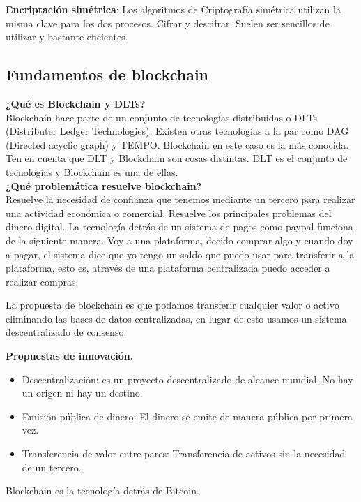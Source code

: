 \documentclass[a4paper,12pt]{lib/pub}
\begin{document}
\textbf{Encriptación simétrica}: Los algoritmos de Criptografía simétrica utilizan la misma clave para los dos procesos. Cifrar y descifrar. Suelen ser sencillos de utilizar y bastante eficientes.

\subsection{Fundamentos de blockchain}
\textbf{¿Qué es Blockchain y DLTs?}\\
Blockchain hace parte de un conjunto de tecnologías distribuidas o DLTs (Distributer Ledger Technologies). Existen otras tecnologías a la par como DAG (Directed acyclic graph) y TEMPO. Blockchain en este caso es la más conocida. Ten en cuenta que DLT y Blockchain son cosas distintas. DLT es el conjunto de tecnologías y Blockchain es una de ellas.\\

\textbf{¿Qué problemática resuelve blockchain?}\\
Resuelve la necesidad de confianza que tenemos mediante un tercero para realizar una actividad económica o comercial.
Resuelve los principales problemas del dinero digital.
La tecnología detrás de un sistema de pagos como paypal funciona de la siguiente manera. Voy a una plataforma, decido comprar algo y cuando doy a pagar, el sistema dice que yo tengo un saldo que puedo usar para transferir a la plataforma, esto es, através de una plataforma centralizada puedo acceder a realizar compras. 

La propuesta de blockchain es que podamos transferir cualquier valor o activo eliminando las bases de datos centralizadas, en lugar de esto usamos un sistema descentralizado de consenso.

\textbf{Propuestas de innovación.}
\begin{itemize}
	\item Descentralización: es un proyecto descentralizado de alcance mundial. No hay un origen ni hay un destino.
	\item Emisión pública de dinero: El dinero se emite de manera pública por primera vez.
	\item Transferencia de valor entre pares: Transferencia de activos sin la necesidad de un tercero.
\end{itemize}
Blockchain es la tecnología detrás de Bitcoin.
\end{document}
